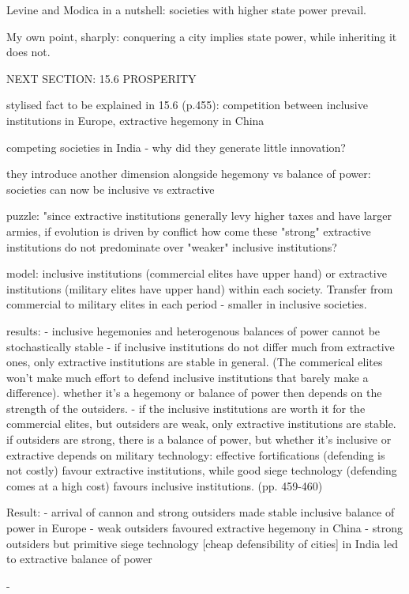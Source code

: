 \documentclass{article}
\begin{document}
Levine and Modica in a nutshell: societies with higher state power prevail.


My own point, sharply: conquering a city implies state power, while inheriting it does not.

NEXT SECTION: 15.6 PROSPERITY

stylised fact to be explained in 15.6 (p.455): competition between inclusive institutions in Europe, extractive hegemony in China

competing societies in India - why did they generate little innovation?

they introduce another dimension alongside hegemony vs balance of power: societies can now be inclusive vs extractive

puzzle: "since extractive institutions generally levy higher taxes and have larger armies, if evolution is driven by conflict how come these "strong" extractive institutions do not predominate over "weaker" inclusive institutions?

model: inclusive institutions (commercial elites have upper hand) or extractive institutions (military elites have upper hand) within each society. Transfer from commercial to military elites in each period - smaller in inclusive societies.

results:
- inclusive hegemonies and heterogenous balances of power cannot be stochastically stable
- if inclusive institutions do not differ much from extractive ones, only extractive institutions are stable in general. (The commerical elites won't make much effort to defend inclusive institutions that barely make a difference). whether it's a hegemony or balance of power then depends on the strength of the outsiders.
- if the inclusive institutions are worth it for the commercial elites, but outsiders are weak, only extractive institutions are stable. if outsiders are strong, there is a balance of power, but whether it's inclusive or extractive depends on military technology: effective fortifications (defending is not costly) favour extractive institutions, while good siege technology (defending comes at a high cost) favours inclusive institutions. (pp. 459-460)

Result: 
- arrival of cannon and strong outsiders made stable inclusive balance of power in Europe
- weak outsiders favoured extractive hegemony in China
- strong outsiders but primitive siege technology [cheap defensibility of cities] in India led to extractive balance of power


- 
\end{document}
